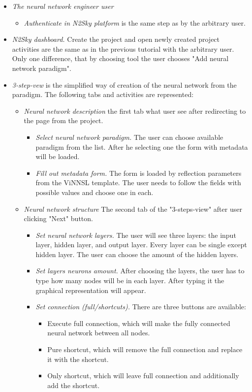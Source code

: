\begin{itemize}
\item \emph{The neural network engineer user} 
\begin{itemize}
\item \emph{Authenticate in N2Sky platform} is the same step as by the arbitrary user.
\end{itemize}
\item \emph{N2Sky dashboard.} Create the project and open newly created project activities are the same as in the previous tutorial with the arbitrary user. Only one difference, that by choosing tool the user chooses "Add neural network paradigm".  
\item \emph{3-step-vew} is the simplified way of creation of the neural network from the paradigm. The following tabs and activities are represented:
\begin{itemize}
\item \emph{Neural network description} the first tab what user see after redirecting to the page from the project. 
\begin{itemize}
\item \emph{Select neural network paradigm.} The user can choose available paradigm from the list. After he selecting one the form with metadata will be loaded.
\item \emph{Fill out metadata form.} The form is loaded by reflection parameters from the ViNNSL template. The user needs to follow the fields with possible values and choose one in each. 
\end{itemize}
\item \emph{Neural network structure} The second tab of the "3-steps-view" after user clicking "Next" button.
\begin{itemize}
\item \emph{Set neural network layers.} The user will see three layers: the input layer, hidden layer, and output layer. Every layer can be single except hidden layer. The user can choose the amount of the hidden layers.
\item \emph{Set layers neurons amount.} After choosing the layers, the user has to type how many nodes will be in each layer. After typing it the graphical representation will appear.
\item \emph{Set connection (full/shortcuts).} There are three buttons are available: 
\begin{itemize}
\item Execute full connection, which will make the fully connected neural network between all nodes.
\item Pure shortcut, which will remove the full connection and replace it with the shortcut.
\item Only shortcut, which will leave full connection and additionally add the shortcut.
\end{itemize}


\end{itemize}
\end{itemize}
\end{itemize}
